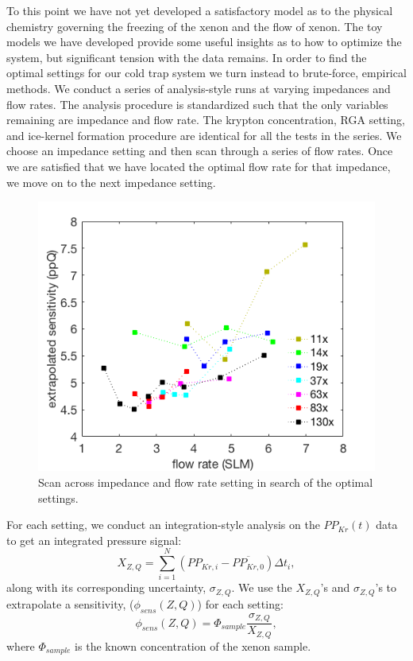 To this point we have not yet developed a satisfactory model as to the physical chemistry governing the freezing of the xenon and the flow of xenon. The toy models we have developed provide some useful insights as to how to optimize the system, but significant tension with the data remains. In order to find the optimal settings for our cold trap system we turn instead to brute-force, empirical methods. We conduct a series of analysis-style runs at varying impedances and flow rates. The analysis procedure is standardized such that the only variables remaining are impedance and flow rate. The krypton concentration, RGA setting, and ice-kernel formation procedure are identical for all the tests in the series. We choose an impedance setting and then scan through a series of flow rates. Once we are satisfied that we have located the optimal flow rate for that impedance, we move on to the next  impedance setting.
\begin{figure}[h]
  \includegraphics[width=\linewidth]{Figures/SLAC_flowimpedance_response_plot.png}
  \caption{Scan across impedance and flow rate setting in search of the optimal settings.}
  \label{fig:sensscan}
\end{figure}

For each setting, we conduct an integration-style analysis on the $PP_{Kr}(t)$ data to get an integrated pressure signal:
\begin{equation}
 X_{Z,Q}=\sum_{i=1}^{N}(PP_{Kr,i}-\overline{PP_{Kr,0}})\Delta t_i,
 \end{equation}
along with its corresponding uncertainty, $\sigma_{Z,Q}$. We use the $X_{Z,Q}$'s and $\sigma_{Z,Q}$'s to extrapolate a sensitivity, ($\phi_{sens}(Z,Q)$) for each setting:
\begin{equation}
\phi_{sens}(Z,Q)=\Phi_{sample}\frac{\sigma_{Z,Q}}{X_{Z,Q}},
\end{equation}
where $\Phi_{sample}$ is the known concentration of the xenon sample. 

